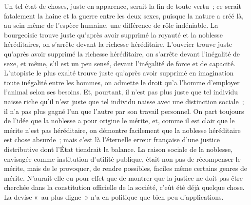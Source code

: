 \documentclass[french,twoside]{book} %
\begin{document}
Un tel état de choses, juste en apparence, serait la fin de toute vertu ; ce serait fatalement la haine et la guerre entre les deux sexes, puisque la nature a créé là, au sein même de l’espèce humaine, une différence de rôle indéniable. La bourgeoisie trouve juste qu’après avoir supprimé la royauté et la noblesse héréditaires, on s’arrête devant la richesse héréditaire. L’ouvrier trouve juste qu’après avoir supprimé la richesse héréditaire, on s’arrête devant l’inégalité de sexe, et même, s’il est un peu sensé, devant l’inégalité de force et de capacité. L’utopiste le plus exalté trouve juste qu’après avoir supprimé en imagination toute inégalité entre les hommes, on admette le droit qu’a l’homme d’employer l’animal selon ses besoins. Et, pourtant, il n’est pas plus juste que tel individu naisse riche qu’il n’est juste que tel individu naisse avec une distinction sociale ; il n’a pas plus gagné l’un que l’autre par son travail personnel. On part toujours de l’idée que la noblesse a pour origine le mérite, et, comme il est clair que le mérite n’est pas héréditaire, on démontre facilement que la noblesse héréditaire est chose absurde ; mais c’est là l’éternelle erreur française d’une justice distributive dont l’État tiendrait la balance. La raison sociale de la noblesse, envisagée comme institution d’utilité publique, était non pas de récompenser le mérite, mais de le provoquer, de rendre possibles, faciles même certains genres de mérite. N’aurait-elle eu pour effet que de montrer que la justice ne doit pas être cherchée dans la constitution officielle de la société, c’eût été déjà quelque chose. La devise « au plus digne » n’a en politique que bien peu d’applications.\par
\end{document}
